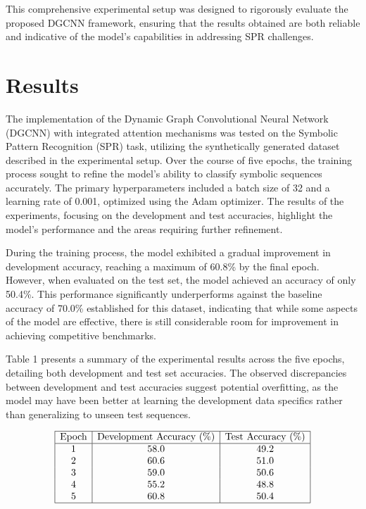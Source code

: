 \documentclass{article}
\begin{document}
This comprehensive experimental setup was designed to rigorously evaluate the proposed DGCNN framework, ensuring that the results obtained are both reliable and indicative of the model's capabilities in addressing SPR challenges.

\section{Results}
The implementation of the Dynamic Graph Convolutional Neural Network (DGCNN) with integrated attention mechanisms was tested on the Symbolic Pattern Recognition (SPR) task, utilizing the synthetically generated dataset described in the experimental setup. Over the course of five epochs, the training process sought to refine the model's ability to classify symbolic sequences accurately. The primary hyperparameters included a batch size of 32 and a learning rate of 0.001, optimized using the Adam optimizer. The results of the experiments, focusing on the development and test accuracies, highlight the model's performance and the areas requiring further refinement.

During the training process, the model exhibited a gradual improvement in development accuracy, reaching a maximum of 60.8\% by the final epoch. However, when evaluated on the test set, the model achieved an accuracy of only 50.4\%. This performance significantly underperforms against the baseline accuracy of 70.0\% established for this dataset, indicating that while some aspects of the model are effective, there is still considerable room for improvement in achieving competitive benchmarks.

Table 1 presents a summary of the experimental results across the five epochs, detailing both development and test set accuracies. The observed discrepancies between development and test accuracies suggest potential overfitting, as the model may have been better at learning the development data specifics rather than generalizing to unseen test sequences.

\[
\begin{array}{|c|c|c|}
\hline
\text{Epoch} & \text{Development Accuracy (\%)} & \text{Test Accuracy (\%)} \\
\hline
1 & 58.0 & 49.2 \\
2 & 60.6 & 51.0 \\
3 & 59.0 & 50.6 \\
4 & 55.2 & 48.8 \\
5 & 60.8 & 50.4 \\
\hline
\end{array}
\]
\end{document}

